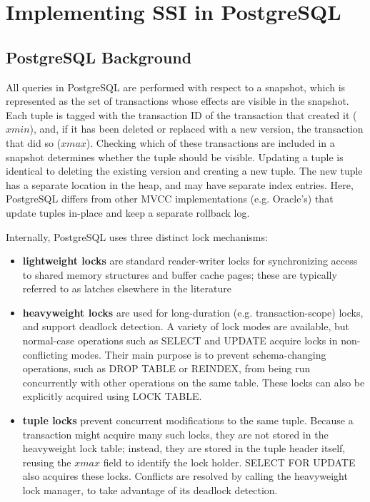 \documentclass[11pt]{article}
\begin{document}
\section{Implementing SSI in PostgreSQL}
\label{sec:org631ae45}
\subsection{PostgreSQL Background}
\label{sec:org15980c4}
All queries in PostgreSQL are performed with respect to a snapshot, which is represented as the set of
transactions whose effects are visible in the snapshot. Each tuple is tagged with the transaction ID
of the transaction that created it (\(xmin\)), and, if it has been deleted or replaced with a new
version, the transaction that did so (\(xmax\)). Checking which of these transactions are included in
a snapshot determines whether the tuple should be visible. Updating a tuple is identical to deleting
the existing version and creating a new tuple. The new tuple has a separate location in the heap, and
may have separate index entries. Here, PostgreSQL differs from other MVCC implementations (e.g.
Oracle’s) that update tuples in-place and keep a separate rollback log.

Internally, PostgreSQL uses three distinct lock mechanisms:
\begin{itemize}
\item \textbf{lightweight locks} are standard reader-writer locks for synchronizing access to shared memory
structures and buffer cache pages; these are typically referred to as latches elsewhere in the literature
\item \textbf{heavyweight locks} are used for long-duration (e.g. transaction-scope) locks, and support deadlock
detection. A variety of lock modes are available, but normal-case operations such as SELECT and
UPDATE acquire locks in non-conflicting modes. Their main purpose is to prevent schema-changing
operations, such as DROP TABLE or REINDEX, from being run concurrently with other operations on the
same table. These locks can also be explicitly acquired using LOCK TABLE.
\item \textbf{tuple locks} prevent concurrent modifications to the same tuple. Because a transaction might acquire
many such locks, they are not stored in the heavyweight lock table; instead, they are stored in the
tuple header itself, reusing the \(xmax\) field to identify the lock holder. SELECT FOR UPDATE also
acquires these locks. Conflicts are resolved by calling the heavyweight lock manager, to take
advantage of its deadlock detection.
\end{itemize}
\end{document}

